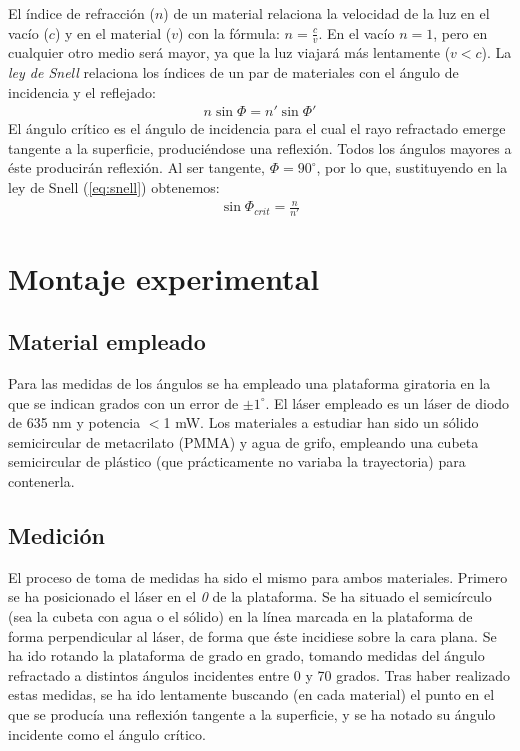 \documentclass[fleqn,usenatbib,openbib]{mnras}
\begin{document}
El índice de refracción ($n$) de un material relaciona la velocidad de la luz en el vacío ($c$) y en el material ($v$) con la fórmula: $n=\frac{c}{v}$. En el vacío $n=1$, pero en cualquier otro medio será mayor, ya que la luz viajará más lentamente ($v<c$). La \textit{ley de Snell} relaciona los índices de un par de materiales con el ángulo de incidencia y el reflejado:
\begin{gather}
    n\sin\Phi = n'\sin\Phi' \label{eq:snell}
\end{gather}
El ángulo crítico es el ángulo de incidencia para el cual el rayo refractado emerge tangente a la superficie, produciéndose una reflexión. Todos los ángulos mayores a éste producirán reflexión. Al ser tangente, $\Phi=90^{\circ}$, por lo que, sustituyendo en la ley de Snell (\ref{eq:snell}) obtenemos:
\begin{gather}
    \sin\Phi_{crit}=\frac{n}{n'} \label{eq:crit}
\end{gather}

\section{Montaje experimental}

\subsection{Material empleado}

Para las medidas de los ángulos se ha empleado una plataforma giratoria en la que se indican grados con un error de $\pm 1^{\circ}$. El láser empleado es un láser de diodo de 635 nm y potencia $<$1 mW. Los materiales a estudiar han sido un sólido semicircular de metacrilato (PMMA) y agua de grifo, empleando una cubeta semicircular de plástico (que prácticamente no variaba la trayectoria) para contenerla.

\subsection{Medición}

El proceso de toma de medidas ha sido el mismo para ambos materiales. Primero se ha posicionado el láser en el \textit{0} de la plataforma. Se ha situado el semicírculo (sea la cubeta con agua o el sólido) en la línea marcada en la plataforma de forma perpendicular al láser, de forma que éste incidiese sobre la cara plana. Se ha ido rotando la plataforma de grado en grado, tomando medidas del ángulo refractado a distintos ángulos incidentes entre 0 y 70 grados. Tras haber realizado estas medidas, se ha ido lentamente buscando (en cada material) el punto en el que se producía una reflexión tangente a la superficie, y se ha notado su ángulo incidente como el ángulo crítico.
\end{document}
